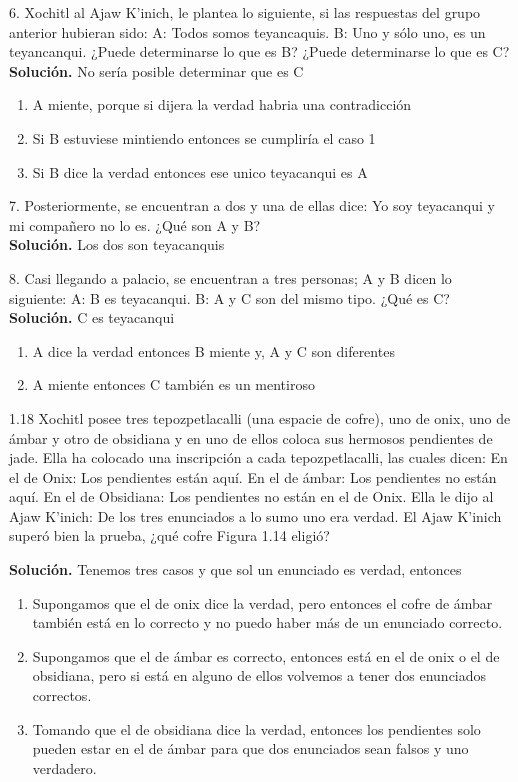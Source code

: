 6. Xochitl al Ajaw K’inich, le plantea lo siguiente, si las respuestas del grupo anterior hubieran sido: A: Todos somos teyancaquis. B: Uno y sólo uno, es un teyancanqui. ¿Puede determinarse lo que es B? ¿Puede determinarse lo que es C?\\

\textbf{Solución.} No sería posible determinar que es C
\begin{enumerate}
    \item A miente, porque si dijera la verdad habria una contradicción
    \item Si B estuviese mintiendo entonces se cumpliría el caso 1
    \item Si B dice la verdad entonces ese unico teyacanqui es A
\end{enumerate}

7. Posteriormente, se encuentran a dos y una de ellas dice: Yo soy teyacanqui y mi compañero no lo es. ¿Qué son A y B? \\

\textbf{Solución.} Los dos son teyacanquis

8. Casi llegando a palacio, se encuentran a tres personas; A y B dicen lo siguiente: A: B es teyacanqui. B: A y C son del mismo tipo. ¿Qué es C?\\
\textbf{Solución.} C es teyacanqui
\begin{enumerate}
    \item A dice la verdad entonces B miente y, A y C son diferentes
    \item A miente entonces C también es un mentiroso
\end{enumerate}


1.18 Xochitl posee tres tepozpetlacalli (una espacie de cofre), uno de onix, uno de ámbar y otro de obsidiana y en uno de ellos coloca sus hermosos pendientes de jade. Ella ha colocado una inscripción a cada tepozpetlacalli, las cuales dicen: En el de Onix: Los pendientes están aquí. En el de ámbar: Los pendientes no están aquí. En el de Obsidiana: Los pendientes no están en el de Onix. Ella le dijo al Ajaw K’inich: De los tres enunciados a lo sumo uno era verdad. El Ajaw K’inich superó bien la prueba, ¿qué cofre Figura 1.14 eligió?

\textbf{Solución.} Tenemos tres casos y que sol un enunciado es verdad, entonces

\begin{enumerate}
    \item Supongamos que el de onix dice la verdad, pero entonces el cofre de ámbar también está en lo correcto y no puedo haber más de un enunciado correcto.
    \item Supongamos que el de ámbar es correcto, entonces está en el de onix o el de obsidiana, pero si está en alguno de ellos volvemos a tener dos enunciados correctos.
    \item Tomando que el de obsidiana dice la verdad, entonces los pendientes solo pueden estar en el de ámbar para que dos enunciados sean falsos y uno verdadero.
\end{enumerate}

